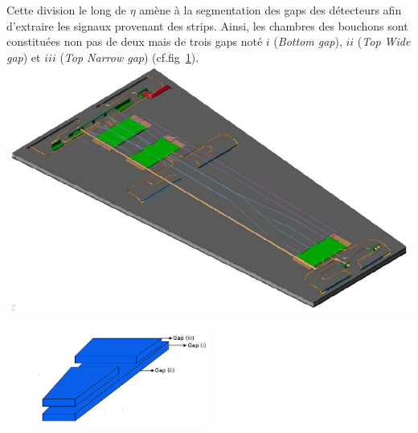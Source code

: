 Cette division le long de $\eta$ amène à la segmentation des gaps des détecteurs afin d'extraire les signaux provenant des strips. Ainsi, les chambres des bouchons sont constituées non pas de deux mais de trois gaps noté $i$ (\textit{Bottom gap}), $ii$ (\textit{Top Wide gap}) et $iii$ (\textit{Top Narrow gap})
 (cf.fig~\ref{gapslayout}). 
\marginpar
{
	\centering
	\includegraphics[width=\marginparwidth]{RPC/schemerpc.png}
	\label{trap}
}
\begin{figure}[ht!]
	\centering
	\includegraphics[width=0.50\textwidth]{RPC/gaps.png}
	\label{gapslayout}
\end{figure}

\vspace{-0.8cm}

